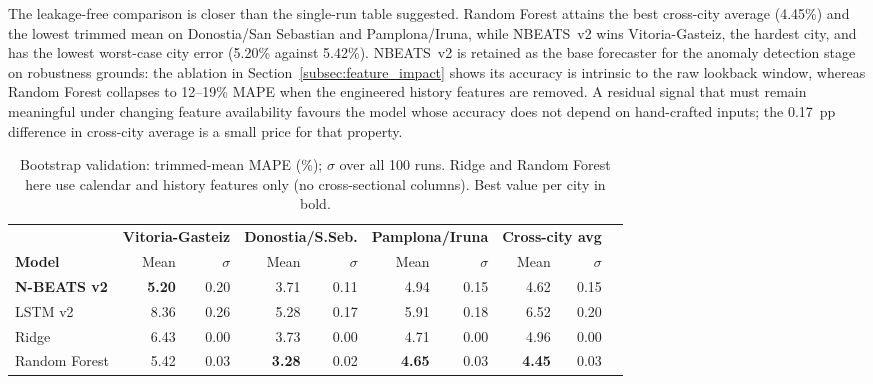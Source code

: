 ﻿\documentclass[12pt,reqno, twoside]{amsbook}
\numberwithin{figure}{chapter}
\numberwithin{table}{chapter}
\numberwithin{equation}{chapter}
\theoremstyle{plain}
\numberwithin{equation}{chapter}
\numberwithin{section}{chapter}
\begin{document}
The leakage-free comparison is closer than the single-run table suggested. Random Forest attains the best cross-city average (4.45\%) and the lowest trimmed mean on Donostia/San Sebastian and Pamplona/Iruna, while \ac{NBEATS}~v2 wins Vitoria-Gasteiz, the hardest city, and has the lowest worst-case city error (5.20\% against 5.42\%). \ac{NBEATS}~v2 is retained as the base forecaster for the anomaly detection stage on robustness grounds: the ablation in Section~\ref{subsec:feature_impact} shows its accuracy is intrinsic to the raw lookback window, whereas Random Forest collapses to 12--19\% \ac{MAPE} when the engineered history features are removed. A residual signal that must remain meaningful under changing feature availability favours the model whose accuracy does not depend on hand-crafted inputs; the 0.17~\ac{pp} difference in cross-city average is a small price for that property.

\begin{table}[htbp]
\centering
\caption{Bootstrap validation: trimmed-mean \ac{MAPE} (\%); $\sigma$ over all 100 runs. Ridge and Random Forest here use calendar and history features only (no cross-sectional columns). Best value per city in bold.}
\label{tab:bootstrap}
\begin{adjustbox}{max width=\textwidth}
\begin{tabular}{lrrrrrrrrr}
\toprule
& \multicolumn{2}{c}{\textbf{Vitoria-Gasteiz}} & \multicolumn{2}{c}{\textbf{Donostia/S.Seb.}} & \multicolumn{2}{c}{\textbf{Pamplona/Iruna}} & \multicolumn{2}{c}{\textbf{Cross-city avg}} \\
\cmidrule(lr){2-3}\cmidrule(lr){4-5}\cmidrule(lr){6-7}\cmidrule(lr){8-9}
\textbf{Model} & Mean & $\sigma$ & Mean & $\sigma$ & Mean & $\sigma$ & Mean & $\sigma$ \\
\midrule
\textbf{N-BEATS v2}         & \textbf{5.20} & 0.20 & 3.71 & 0.11 & 4.94 & 0.15 & 4.62 & 0.15 \\
LSTM v2                     & 8.36 & 0.26 & 5.28 & 0.17 & 5.91 & 0.18 & 6.52 & 0.20 \\
Ridge                       & 6.43 & 0.00 & 3.73 & 0.00 & 4.71 & 0.00 & 4.96 & 0.00 \\
Random Forest               & 5.42 & 0.03 & \textbf{3.28} & 0.02 & \textbf{4.65} & 0.03 & \textbf{4.45} & 0.03 \\
\bottomrule
\end{tabular}
\end{adjustbox}
\end{table}
\end{document}
